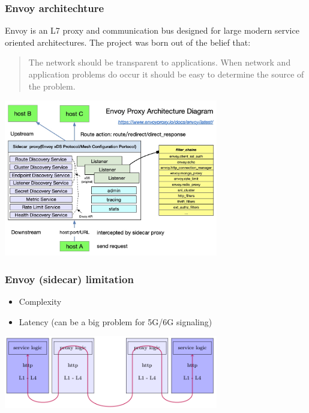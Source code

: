 \documentclass{beamer}
\begin{document}
\begin{frame}
  \frametitle{Envoy architechture}
  Envoy is an L7 proxy and communication bus designed for large modern service oriented architectures. The project was born out of the belief that:

  \begin{quote}\small The network should be transparent to applications. When network and application problems do occur it should be easy to determine the source of the problem.
  \end{quote}
  \center
  \includegraphics[width=0.7\textwidth]{images/envoy-arch}
\end{frame}

\begin{frame}
  \frametitle{Envoy (sidecar) limitation}
  \begin{itemize}
    \item {Complexity}
    \item {Latency (can be a big problem for 5G/6G signaling)}
  \end{itemize}
  \begin{center}
    \includegraphics[width=0.7\textwidth]{images/envoy-latency}
  \end{center}
  
\end{frame}
\end{document}
